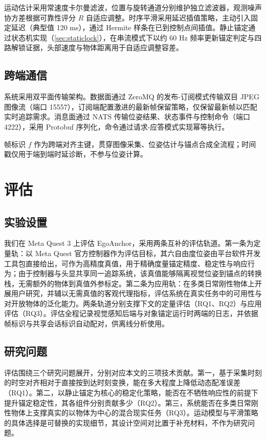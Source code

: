 \documentclass[review]{vgtc}
\begin{document}
运动估计采用常速度卡尔曼滤波，位置与旋转通道分别维护独立滤波器，观测噪声协方差根据可靠性评分 $R$ 自适应调整。时序平滑采用延迟插值策略，主动引入固定延迟（典型值 120 ms），通过 Hermite 样条在已到控制点间插值。静止锚定通过状态机实现（\ref{sec:staticlock}），在串流模式下以约 60 Hz 频率更新锚定判定与四路解锁证据，头部速度与物体距离用于自适应调整容差。

\subsection{跨端通信}


系统采用双平面传输架构。数据面通过 ZeroMQ 的发布-订阅模式传输双目 JPEG 图像流（端口 15557），订阅端配置激进的最新帧保留策略，仅保留最新帧以匹配实时追踪需求。消息面通过 NATS 传输位姿结果、状态事件与控制命令（端口 4222），采用 Protobuf 序列化，命令通过请求-应答模式实现幂等执行。

帧标识 $f$ 作为跨端对齐主键，贯穿图像采集、位姿估计与锚点合成全流程；时间戳仅用于端到端时延诊断，不参与位姿计算。

\section{评估}\label{sec:eval}


\subsection{实验设置}


我们在 Meta Quest 3 上评估 EgoAnchor，采用两条互补的评估轨道。第一条为定量轨：以 Meta Quest 官方控制器作为评估目标，其六自由度位姿由平台软件开发工具包直接给出，可作为高精度真值，用于精确度量锚定精度、稳定性与响应行为；由于控制器与头显共享同一追踪系统，该真值能够隔离视觉位姿到锚点的转换栈，无需额外的物体到真值外参标定。第二条为应用轨：在多类日常刚性物体上开展用户研究，并辅以无需真值的客观代理指标，评估系统在真实任务中的可用性与对开放物体的泛化能力。两条轨道分别支撑下文的定量评估（RQ1、RQ2）与应用评估（RQ3）。评估全程记录视觉感知后端与对象锚定运行时两端的日志，并依据帧标识与共享会话标识自动配对，供离线分析使用。

\subsection{研究问题}


评估围绕三个研究问题展开，分别对应本文的三项技术贡献。第一，基于采集时刻的时空对齐相对于直接按到达时刻变换，能在多大程度上降低动态配准误差（RQ1）。第二，以静止锚定为核心的稳定化策略，能否在不牺牲响应性的前提下提升锚定稳定性，其各组件分别贡献多少（RQ2）。第三，系统能否在多类日常刚性物体上支撑真实的以物体为中心的混合现实任务（RQ3）。运动模型与平滑策略的具体选择是可替换的实现细节，其设计空间对比置于补充材料，不作为研究问题。
\end{document}

